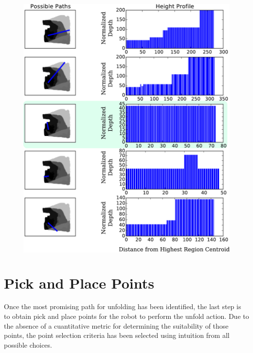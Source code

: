 \begin{figure}[thpb]
    \centering
    \includegraphics[width=\textwidth]{figures/candidate_paths.pdf}
    \caption{}
    \label{fig:paths_with_bumpiness}
\end{figure}

\section{Pick and Place Points}
\label{pick_and_place}
Once the most promising path for unfolding has been identified, the last step is to obtain pick and place points for the robot to perform the unfold action. Due to the absence of a cuantitative metric for determining the suitability of those points, the point selection criteria has been selected using intuition from all possible choices.

